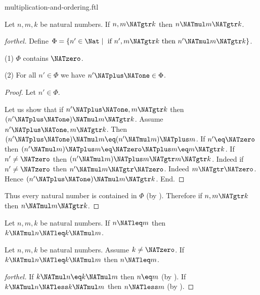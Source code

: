 \documentclass{naproche-library}
\begin{document}
\begin{smodule}[title=Multiplication and Ordering]{multiplication-and-ordering.ftl}
\begin{proposition}[forthel,id=ARITHMETIC_06_1826268599287808]
  Let $n, m, k$ be natural numbers.
  If $n, m \NATgtr k$ then $n \NATmul m \NATgtr k$.
\end{proposition}
\begin{proof}[forthel]
  Define $\Phi = \{ n' \in \Nat \mid\text{ if }n', m \NATgtr k\text{ then }n' \NATmul m \NATgtr k \}$.

  (1) $\Phi$ contains $\NATzero$.

  (2) For all $n' \in \Phi$ we have $n' \NATplus \NATone \in \Phi$.
  \begin{proof}
    Let $n' \in \Phi$.

    Let us show that if $n' \NATplus \NATone, m \NATgtr k$ then $(n' \NATplus \NATone) \NATmul m \NATgtr k$.
      Assume $n' \NATplus \NATone, m \NATgtr k$.
      Then $(n' \NATplus \NATone) \NATmul m \eq (n' \NATmul m) \NATplus m$.
      If $n' \eq \NATzero$ then
      $(n' \NATmul m) \NATplus m
        \eq \NATzero \NATplus m
        \eq m
        \NATgtr k$.
      If $n' \neq \NATzero$ then
      $(n' \NATmul m) \NATplus m
        \NATgtr m
        \NATgtr k$.
      Indeed if $n' \neq \NATzero$ then $n' \NATmul m \NATgtr \NATzero$.
      Indeed $m \NATgtr \NATzero$.
      Hence $(n' \NATplus \NATone) \NATmul m \NATgtr k$.
    End.
  \end{proof}

  Thus every natural number is contained in $\Phi$ (by ).
  Therefore if $n, m \NATgtr k$ then $n \NATmul m \NATgtr k$.
\end{proof}

\begin{corollary}[forthel,id=ARITHMETIC_06_1751605544222720]
  Let $n, m, k$ be natural numbers.
  If $n \NATleq m$ then $k \NATmul n \NATleq k \NATmul m$.
\end{corollary}

\begin{corollary}[forthel,id=ARITHMETIC_06_3965209318260736]
  Let $n, m, k$ be natural numbers.
  Assume $k \neq \NATzero$.
  If $k \NATmul n \NATleq k \NATmul m$ then $n \NATleq m$.
\end{corollary}
\begin{proof}[forthel]
  If $k \NATmul n \eq k \NATmul m$ then $n \eq m$ (by ).
  If $k \NATmul n \NATless k \NATmul m$ then $n \NATless m$ (by ).
\end{proof}


\end{smodule}
\end{document}
